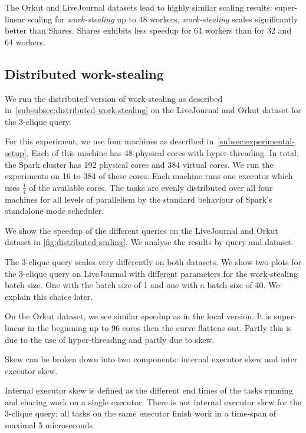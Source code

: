 The Orkut and LiveJournal datasets lead to highly similar scaling results:
super-linear scaling for \textit{work-stealing} up to 48 workers,
\textit{work-stealing} scales significantly better than Shares.
Shares exhibits less speedup for 64 workers than for 32 and 64 workers.




\subsection{Distributed work-stealing}\label{subsec:distributed-work-stealing}


We run the distributed version of work-stealing as described in~\cref{subsubsec:distributed-work-stealing}
on the LiveJournal and Orkut dataset for the 3-clique query.

For this experiment, we use four machines as described in~\cref{subsec:experimental-setup}.
Each of this machine has 48 physical cores with hyper-threading.
In total, the Spark cluster has 192 physical cores and 384 virtual cores.
We run the experiments on 16 to 384 of these cores.
Each machine runs one executor which uses $\frac{1}{4}$ of the available cores.
The tasks are evenly distributed over all four machines for all levels of parallelism by
the standard behaviour of Spark's standalone mode scheduler.

We show the speedup of the different queries on the LiveJournal and Orkut dataset in \cref{fig:distributed-scaling}.
We analyse the results by query and dataset.

The 3-clique query scales very differently on both datasets.
We show two plots for the 3-clique query on LiveJournal with different parameters for the work-stealing
batch size.
One with the batch size of 1 and one with a batch size of 40.
We explain this choice later.

On the Orkut dataset, we see similar speedup as in the local version.
It is super-linear in the beginning up to 96 cores then the curve flattens out.
Partly this is due to the use of hyper-threading and partly due to skew.

Skew can be broken down into two components: internal executor skew and inter executor skew.

Internal executor skew is defined as the different end times of the tasks running and sharing work on
a single executor.
There is not internal executor skew for the 3-clique query;
all tasks on the same executor finish work in a time-span of maximal 5 microseconds.

